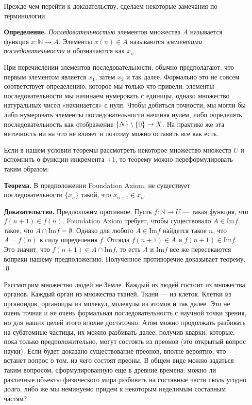 Прежде чем перейти к доказательству, сделаем некоторые замечания по терминологии.

{\bfseries Определение.} {\slshape Последовательностью} элементов множества $A$ называется функция $x:\mathbb{N}\to A$. Элементы $x(n)\in A$ называются {\slshape элементами последовательности} и обозначаются как $x_n$.

При перечислении элементов последовательности, обычно предполагают, что первым элементом является $x_1$, затем $x_2$ и так далее. Формально это не совсем соответствует определению, которое мы только что привели: элементы последовательности мы начинаем нумеровать с единицы, однако множество натуральных чисел «начинается» с нуля. Чтобы добиться точности, мы могли бы либо нумеровать элементы последовательности начиная нулем, либо определять последовательность как отображение $\mathbb\{N\}\setminus \{0\} \to X$. На практике же эта неточность ни на что не влияет и поэтому можно оставить все как есть.

Если в нашем условии теоремы рассмотреть некоторое множество множеств $U$ и вспомнить о функции инкремента $+1$, то теорему можно переформулировать таким образом:

{\bfseries Теорема.} В предположении Foundation Axiom, не существует последовательности $\{x_n\}$ такой, что $x_{n+1} \in x_n$.

{\bfseries Доказательство.} Предположим противное. Пусть $f: \mathbb{N}\to U$ — такая функция, что $f(n+1) \in f(n)$. Foundation Axiom требует, чтобы существовало $A\in \mathrm{Im} f$, такое, что $A \cap \mathrm{Im}f = \emptyset$. Однако для любого $A\in \mathrm{Im} f$ найдется такое $n$, что $A = f(n)$ в силу определения $f$. Отсюда $f(n+1) \in A$ и $f(n+1)\in \mathrm{Im}f$. Это значит, что $f(n+1)\in A \cap \mathrm{Im}f$, то есть $A$ и $\mathrm{Im}f$ все же пересекаются вопреки нашему предположению. Полученное противоречие доказывает теорему. \qed

Рассмотрим множество людей не Земле. Каждый из людей состоит из множества органов. Каждый орган из множества тканей. Ткани — из клеток. Клетки из органоидов, органоиды из молекул, молекулы из атомов и так далее. Это не очень точная и не очень формальная последовательность с научной точки зрения, но для наших целей этого вполне достаточно. Атом можно продолжать разбивать на субатомные частицы, их можно разбивать далее, получив кварки, которые, пока только предположительно, могут состоять из преонов (это открытый вопрос науки). Если будет доказано существование преонов, вполне вероятно, что встанет вопрос о том, из чего состоят преоны. В общем виде можно задаться таким вопросом, сформулированную еще в древние времена: можно ли различные объекты физического мира разбивать на составные части сколь угодно долго, либо же мы неминуемо придем к некоторым неделимым составным частям?

